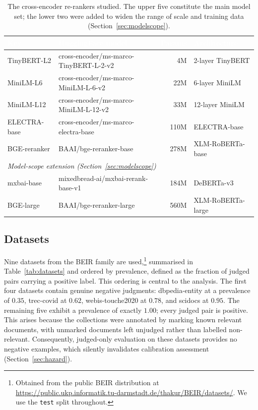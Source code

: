 \documentclass[sn-mathphys-num,pdflatex]{sn-jnl}
\newcommand{\thead}[1]{\textcolor{white}{\textbf{#1}}}
\begin{document}
\begin{table}[t]
\centering
\caption{The cross-encoder re-rankers studied. The upper five constitute the main
model set; the lower two were added to widen the range of scale and training data
(Section~\ref{sec:modelscope}).}\label{tab:models}
\small
\begin{tabular}{llrl}
\toprule
\rowcolor{headblue}
\thead{Key} & \thead{HuggingFace model} & \thead{Params} & \thead{Architecture} \\
\midrule
\rowcolor{rowlight}
TinyBERT-L2  & cross-encoder/ms-marco-TinyBERT-L-2-v2 & 4M   & 2-layer TinyBERT \\
\rowcolor{rowwhite}
MiniLM-L6    & cross-encoder/ms-marco-MiniLM-L-6-v2   & 22M  & 6-layer MiniLM \\
\rowcolor{rowlight}
MiniLM-L12   & cross-encoder/ms-marco-MiniLM-L-12-v2  & 33M  & 12-layer MiniLM \\
\rowcolor{rowwhite}
ELECTRA-base & cross-encoder/ms-marco-electra-base    & 110M & ELECTRA-base \\
\rowcolor{rowlight}
BGE-reranker & BAAI/bge-reranker-base                 & 278M & XLM-RoBERTa-base \\
\midrule
\multicolumn{4}{l}{\textit{Model-scope extension (Section~\ref{sec:modelscope})}} \\
\rowcolor{cleangreen}
mxbai-base   & mixedbread-ai/mxbai-rerank-base-v1     & 184M & DeBERTa-v3 \\
\rowcolor{cleangreen}
BGE-large    & BAAI/bge-reranker-large                & 560M & XLM-RoBERTa-large \\
\bottomrule
\end{tabular}
\end{table}

\subsection{Datasets}\label{sec:datasets}
Nine datasets from the BEIR family \cite{thakur2021beir} are used,\footnote{Obtained
from the public BEIR distribution at
\url{https://public.ukp.informatik.tu-darmstadt.de/thakur/BEIR/datasets/}. We use
the \texttt{test} split throughout.} summarised in
Table~\ref{tab:datasets} and ordered by prevalence, defined as the fraction of
judged pairs carrying a positive label. This ordering is central to the analysis.
The first four datasets contain genuine negative judgments: dbpedia-entity at a
prevalence of $0.35$, trec-covid at $0.62$, webis-touche2020 at $0.78$, and
scidocs at $0.95$. The remaining five exhibit a prevalence of exactly $1.00$;
every judged pair is positive. This arises because the collections were annotated
by marking known relevant documents, with unmarked documents left unjudged rather
than labelled non-relevant. Consequently, judged-only evaluation on these
datasets provides no negative examples, which silently invalidates calibration
assessment (Section~\ref{sec:hazard}).
\end{document}
